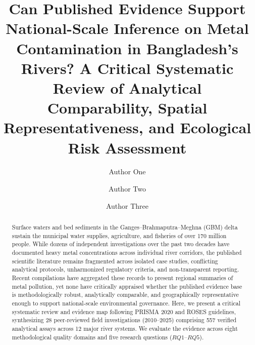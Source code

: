 \documentclass[authoryear,preprint,12pt]{elsarticle}
\begin{document}
\begin{frontmatter}

\title{Can Published Evidence Support National-Scale Inference on Metal Contamination in Bangladesh's Rivers? A Critical Systematic Review of Analytical Comparability, Spatial Representativeness, and Ecological Risk Assessment}

\author[inst1]{Author One}
\author[inst1,inst2]{Author Two}
\author[inst2]{Author Three}




\begin{abstract}
Surface waters and bed sediments in the Ganges--Brahmaputra--Meghna (GBM) delta sustain the municipal water supplies, agriculture, and fisheries of over 170 million people. While dozens of independent investigations over the past two decades have documented heavy metal concentrations across individual river corridors, the published scientific literature remains fragmented across isolated case studies, conflicting analytical protocols, unharmonized regulatory criteria, and non-transparent reporting. Recent compilations have aggregated these records to present regional summaries of metal pollution, yet none have critically appraised whether the published evidence base is methodologically robust, analytically comparable, and geographically representative enough to support national-scale environmental governance. Here, we present a critical systematic review and evidence map following PRISMA 2020 and ROSES guidelines, synthesizing 28 peer-reviewed field investigations (2010--2025) comprising 557 verified analytical assays across 12 major river systems. We evaluate the evidence across eight methodological quality domains and five research questions ($RQ1$--$RQ5$). 


\end{abstract}
\end{frontmatter}
\end{document}
